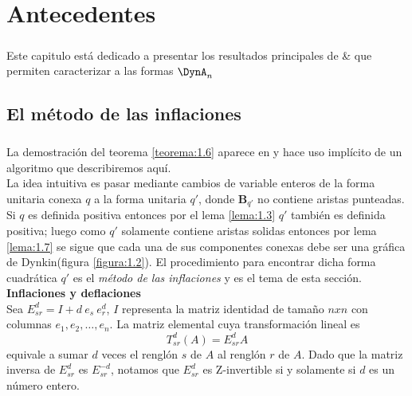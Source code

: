 \chapter{Antecedentes}
\paragraph{}
Este capitulo está dedicado a presentar los resultados principales de \citep{alma991031505829703276} \& \citep{Barot1999ACO} que permiten caracterizar a las formas $\DynA_{n}$
\section{El método de las inflaciones}\label{sec:2.1}
\paragraph{}
La demostración del teorema \ref{teorema:1.6} aparece en \citep{alma991031505829703276} y hace uso implícito de un algoritmo que describiremos aquí.\\
\newline
La idea intuitiva es pasar mediante cambios de variable enteros de la forma unitaria conexa $q$ a la forma unitaria $q'$, donde $\textbf{B}_{q'}$ no contiene aristas punteadas. Si $q$ es definida positiva entonces por el lema \ref{lema:1.3} $q'$ también es definida positiva; luego como $q'$ solamente contiene aristas solidas entonces por lema \ref{lema:1.7} se sigue que cada una de sus componentes conexas debe ser una gráfica de Dynkin(figura \ref{figura:1.2}). El procedimiento para encontrar dicha forma cuadrática $q'$ es el \textit{método de las inflaciones} y es el tema de esta sección.\\
\newline
\textbf{Inflaciones y deflaciones}\\
Sea $E_{sr}^{d} = I + d~e_{s}~e_{r}^{d}$, $I$ representa la matriz identidad de tamaño $nxn$ con columnas $e_{1}, e_{2}, \ldots, e_n{}$. La matriz elemental cuya transformación lineal es
\begin{equation*}
    T_{sr}^{d}\left(A\right) = E_{sr}^{d}A
\end{equation*}
equivale a sumar $d$ veces el renglón $s$ de $A$ al renglón $r$ de $A$. Dado que la matriz inversa de $E_{sr}^{d}$ es $E_{sr}^{-d}$, notamos que $E_{sr}^{d}$ es $\mathrm{Z}$-invertible si y solamente si $d$ es un número entero.
